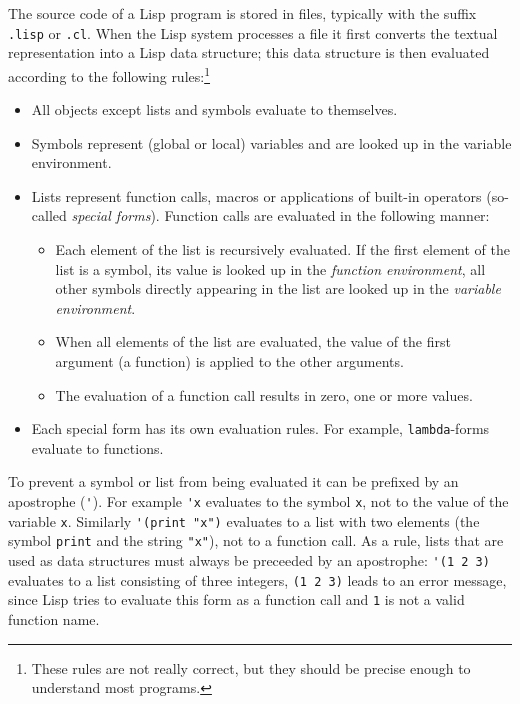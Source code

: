 \documentclass[a4paper]{amsart}
\begin{document}
The source code of a Lisp program is stored in files, typically with
the suffix \verb|.lisp| or \verb|.cl|.  When the Lisp system processes
a file it first converts the textual representation into a Lisp data
structure; this data structure is then evaluated according to the
following rules:\footnote{These rules are not really correct, but they
  should be precise enough to understand most programs.}
\begin{itemize}
\item All objects except lists and symbols evaluate to themselves.
\item Symbols represent (global or local) variables and are looked up
  in the variable environment.
\item Lists represent function calls, macros or applications of
  built-in operators (so-called \emph{special forms}).  Function calls
  are evaluated in the following manner:
  \begin{itemize}
  \item Each element of the list is recursively evaluated.  If the
    first element of the list is a symbol, its value is looked up in
    the \emph{function environment}, all other symbols directly
    appearing in the list are looked up in the \emph{variable
      environment}.
  \item When all elements of the list are evaluated, the value of the
    first argument (a function) is applied to the other arguments.
  \item The evaluation of a function call results in zero, one or more
    values.
  \end{itemize}
\item Each special form has its own evaluation rules.  For example,
  \texttt{lambda}-forms evaluate to functions.
\end{itemize}

To prevent a symbol or list from being evaluated it can be prefixed by
an apostrophe (\verb|'|).  For example \verb|'x| evaluates to the
symbol \texttt{x}, not to the value of the variable \texttt{x}.
Similarly \verb|'(print "x")| evaluates to a list with two elements
(the symbol \texttt{print} and the string \verb|"x"|), not to a
function call.  As a rule, lists that are used as data structures must
always be preceeded by an apostrophe: \verb|'(1 2 3)| evaluates to a
list consisting of three integers, \verb|(1 2 3)| leads to an error
message, since Lisp tries to evaluate this form as a function call and
\texttt{1} is not a valid function name.
\end{document}
